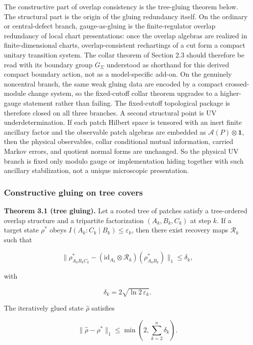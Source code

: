 The constructive part of overlap consistency is the tree-gluing theorem below. The structural part is the origin of the gluing redundancy itself. On the ordinary or central-defect branch, gauge-as-gluing is the finite-regulator overlap redundancy of local chart presentations: once the overlap algebras are realized in finite-dimensional charts, overlap-consistent rechartings of a cut form a compact unitary transition system. The collar theorem of Section 2.3 should therefore be read with its boundary group \(G_\Sigma\) understood as shorthand for this derived compact boundary action, not as a model-specific add-on. On the genuinely noncentral branch, the same weak gluing data are encoded by a compact crossed-module change system, so the fixed-cutoff collar theorem upgrades to a higher-gauge statement rather than failing. The fixed-cutoff topological package is therefore closed on all three branches.
A second structural point is UV underdetermination. If each patch Hilbert space is tensored with an inert finite ancillary factor and the observable patch algebras are embedded as \(\mathcal A(P)\otimes \mathbf 1\), then the physical observables, collar conditional mutual information, carried Markov errors, and quotient normal forms are unchanged. So the physical UV branch is fixed only modulo gauge or implementation hiding together with such ancillary stabilization, not a unique microscopic presentation.

\subsubsection{Constructive gluing on tree covers}\label{31-constructive-gluing-on-tree-covers}

\textbf{Theorem 3.1 (tree gluing).} Let a rooted tree of patches satisfy a tree-ordered overlap structure and a tripartite factorization \((A_k, B_k, C_k)\) at step \(k\). If a target state \(\rho^{\ast}\) obeys \(I(A_k:C_k \mid B_k) \le \varepsilon_k\), then there exist recovery maps \(\mathcal{R}_k\) such that

\[
\| \rho^{\ast}_{A_k B_k C_k} - (\mathrm{id}_{A_k} \otimes \mathcal{R}_k)(\rho^{\ast}_{A_k B_k}) \|_1
\le \delta_k,
\]

with

\[
\delta_k = 2 \sqrt{\ln 2\, \varepsilon_k}.
\]

The iteratively glued state \(\hat{\rho}\) satisfies

\[
\| \hat{\rho} - \rho^{\ast} \|_1 \le \min\left(2, \sum_{k=2}^n \delta_k\right).
\]


